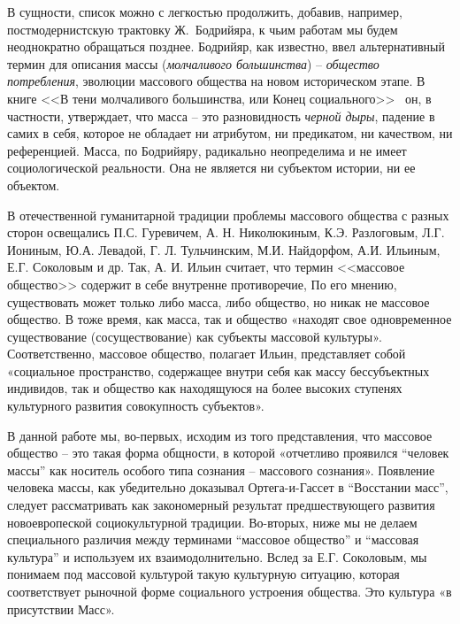 В сущности, список можно с легкостью продолжить, добавив, например, постмодернистскую
трактовку Ж.~Бодрийяра, к чьим работам мы будем неоднократно обращаться позднее.
Бодрийяр, как известно, ввел альтернативный термин для описания массы (\emph{молчаливого большинства}) --
\emph{общество потребления}, эволюции массового общества на новом историческом этапе.
В книге <<В тени молчаливого большинства, или Конец социального>>~\autocite{book:bodriyar} он, в частности,
утверждает, что масса -- это разновидность \emph{черной дыры}, падение в самих в
себя, которое не обладает ни атрибутом, ни предикатом, ни качеством, ни референцией.
Масса, по Бодрийяру, радикально неопределима и не имеет социологической реальности.
Она не является ни субъектом истории, ни ее объектом.

В отечественной гуманитарной традиции проблемы массового общества с разных сторон освещались П.С. Гуревичем, А. Н. Николюкиным, К.Э. Разлоговым, Л.Г. Иониным, Ю.А. Левадой, Г. Л. Тульчинским, М.И. Найдорфом, А.И. Ильиным, Е.Г. Соколовым и др. Так, А. И. Ильин считает, что термин <<массовое общество>> содержит в себе внутренне противоречие, По его мнению, существовать может только либо масса, либо общество, но никак не массовое общество. В тоже время, как масса, так и общество «находят свое одновременное существование (сосуществование) как субъекты массовой культуры»\autocite[][79]{ilin2010}. Соответственно, массовое общество, полагает Ильин, представляет собой «социальное пространство, содержащее внутри себя как массу бессубъектных индивидов, так и общество как находящуюся на более высоких ступенях культурного развития совокупность субъектов»\autocite[][79]{ilin2010}.

В данной работе мы, во-первых, исходим из того представления, что массовое общество – это такая форма общности, в которой «отчетливо проявился “человек массы” как носитель особого типа сознания – массового сознания»\autocite[][289]{kagan2007}. Появление человека массы, как убедительно доказывал Ортега-и-Гассет в “Восстании масс”, следует рассматривать как закономерный результат предшествующего развития новоевропеской социокультурной традиции. Во-вторых, ниже мы не делаем специального различия между терминами “массовое общество” и “массовая культура” и используем их взаимодолнительно. Вслед за Е.Г. Соколовым\autocite{sokolov2002}, мы понимаем под массовой культурой такую культурную ситуацию, которая соответствует рыночной форме социального устроения общества\autocite[][20]{edoshina2000}. Это культура «в присутствии Масс»\autocite[][289]{kagan2007}.

